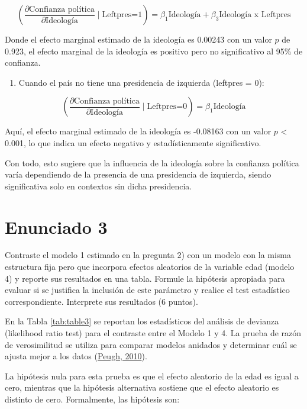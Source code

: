 \documentclass[
  12pt,
  a4paper,
]{article}
\providecommand{\tightlist}{%
  \setlength{\itemsep}{0pt}\setlength{\parskip}{0pt}}
\begin{document}
\[(\frac{\partial\text{Confianza política}}{\partial\text{Ideología}}\mid\text{Leftpres=1}) = \beta_1\text{Ideología}+\beta_3\text{Ideología x Leftpres}
\]

Donde el efecto marginal estimado de la ideología es 0.00243 con un valor \(p\) de 0.923, el efecto marginal de la ideología es positivo pero no significativo al 95\% de confianza.

\begin{enumerate}
\def\labelenumi{\arabic{enumi}.}
\setcounter{enumi}{1}
\tightlist
\item
  Cuando el país no tiene una presidencia de izquierda (leftpres = 0):
\end{enumerate}

\[(\frac{\partial\text{Confianza política}}{\partial\text{Ideología}}\mid\text{Leftpres=0}) = \beta_1\text{Ideología}
\]

Aquí, el efecto marginal estimado de la ideología es -0.08163 con un valor \(p\) \textless{} 0.001, lo que indica un efecto negativo y estadísticamente significativo.

Con todo, esto sugiere que la influencia de la ideología sobre la confianza política varía dependiendo de la presencia de una presidencia de izquierda, siendo significativa solo en contextos sin dicha presidencia.

\hypertarget{enunciado-3}{%
\section{Enunciado 3}\label{enunciado-3}}

Contraste el modelo 1 estimado en la pregunta 2) con un modelo con la misma estructura fija pero que incorpora efectos aleatorios de la variable edad (modelo 4) y reporte sus resultados en una tabla. Formule la hipótesis apropiada para evaluar si se justifica la inclusión de este parámetro y realice el test estadístico correspondiente. Interprete sus resultados (6 puntos).

En la Tabla \ref{tab:table3} se reportan los estadísticos del análisis de devianza (likelihood ratio test) para el contraste entre el Modelo 1 y 4. La prueba de razón de verosimilitud se utiliza para comparar modelos anidados y determinar cuál se ajusta mejor a los datos (\protect\hyperlink{ref-peugh_practical_2010}{Peugh, 2010}).

La hipótesis nula para esta prueba es que el efecto aleatorio de la edad es igual a cero, mientras que la hipótesis alternativa sostiene que el efecto aleatorio es distinto de cero. Formalmente, las hipótesis son:
\end{document}
